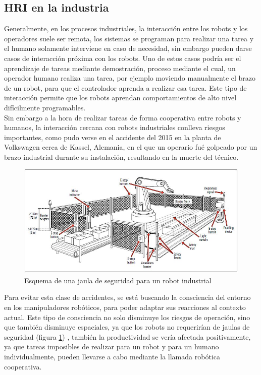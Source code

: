  \subsection{HRI en la industria}
 
 Generalmente, en los procesos industriales, la interacción entre los robots y los operadores suele ser remota, los sistemas se programan para realizar una tarea y el humano solamente interviene en caso de necesidad, sin embargo pueden darse casos de interacción próxima con los robots. Uno de estos casos podría ser el aprendizaje de tareas mediante demostración, proceso mediante el cual, un operador humano realiza una tarea, por ejemplo moviendo manualmente el brazo de un robot, para que el controlador aprenda a realizar esa tarea. Este tipo de interacción permite que los robots aprendan comportamientos de alto nivel difícilmente programables.\\
 Sin embargo a la hora de realizar tareas de forma cooperativa entre robots y humanos, la interacción cercana con robots industriales conlleva riesgos importantes, como pudo verse en el accidente del 2015\cite{vwaccident2015} en la planta de Volkswagen cerca de Kassel, Alemania, en el que un operario fué golpeado por un brazo industrial  durante su instalación, resultando en la muerte del técnico.
  \begin{figure}
	\centering
	\includegraphics[width=1\linewidth]{imagenes/robotcell.jpeg}
	\caption{Esquema de una jaula de seguridad para un robot industrial}
	\label{fig:robot-cell}
\end{figure} 
 Para evitar esta clase de accidentes, se está buscando la consciencia del entorno en los manipuladores robóticos, para poder adaptar sus reacciones al contexto actual. Este tipo de consciencia no solo disminuye los riesgos de operación, sino que también disminuye espaciales, ya que los robots no requerirían de jaulas de seguridad (figura \ref{fig:robot-cell}) , también la productividad se vería afectada positivamente, ya que tareas imposibles de realizar para un robot y para un humano individualmente, pueden llevarse a cabo mediante la llamada robótica cooperativa.
